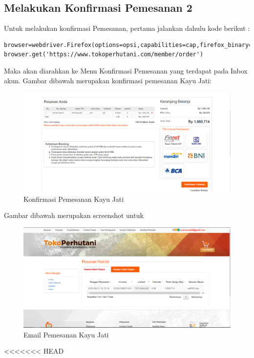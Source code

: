 \newpage
\subsection {Melakukan Konfirmasi Pemesanan 2}
Untuk melakukan konfirmasi Pemesanan, pertama jalankan dahulu kode berikut :
\begin{verbatim}
browser=webdriver.Firefox(options=opsi,capabilities=cap,firefox_binary=binary)
browser.get('https://www.tokoperhutani.com/member/order')
\end{verbatim}

Maka akan diarahkan ke Menu Konfirmasi Pemesanan yang terdapat pada Inbox akun.
Gambar dibawah merupakan konfirmasi pemesanan Kayu Jati:
\begin{figure}[h]
	\centering
	\includegraphics[scale=0.25]{figures/T6_1}
	\caption{Konfirmasi Pemesanan Kayu Jati}
\end{figure}

Gambar dibawah merupakan screenshot untuk
\begin{figure}[h]
	\centering
	\includegraphics[scale=0.25]{figures/T6_2}
	\caption{Email Pemesanan Kayu Jati}
\end{figure}


\newpage
<<<<<<< HEAD

